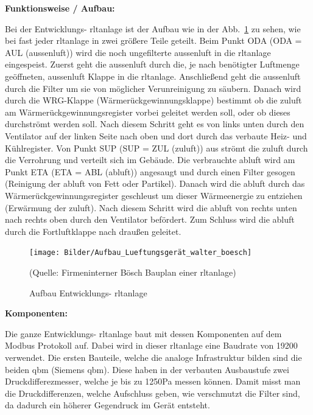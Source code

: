 \textbf{Funktionsweise / Aufbau:}

Bei der Entwicklungs- \ac{rltanlage} ist der Aufbau wie in der Abb.~\ref{fig:Bauplan_entwicklung} zu sehen, wie bei fast jeder \ac{rltanlage} in zwei größere Teile geteilt.
Beim Punkt ODA (ODA = AUL (\gls{aussenluft})) wird die noch ungefilterte \gls{aussenluft} in die \ac{rltanlage} eingespeist. Zuerst geht die \gls{aussenluft} durch die, je nach benötigter Luftmenge geöffneten, \gls{aussenluft} Klappe in die \ac{rltanlage}. Anschließend geht die \gls{aussenluft} durch die Filter um sie von möglicher Verunreinigung zu säubern. Danach wird durch die WRG-Klappe (Wärmerückgewinnungsklappe) bestimmt ob die \gls{zuluft} am Wärmerückgewinnungsregister vorbei geleitet werden soll, oder ob dieses durchströmt werden soll. Nach diesem Schritt geht es von links unten durch den Ventilator auf der linken Seite nach oben und dort durch das verbaute Heiz- und Kühlregister. Von Punkt SUP (SUP = ZUL (\gls{zuluft})) aus strömt die \gls{zuluft} durch die Verrohrung und verteilt sich im Gebäude. Die verbrauchte \gls{abluft} wird am Punkt ETA (ETA = ABL (\gls{abluft})) angesaugt und durch einen Filter gesogen (Reinigung der \gls{abluft} von \zB Fett oder Partikel). Danach wird die \gls{abluft} durch das Wärmerückgewinnungsregister geschleust um dieser Wärmeenergie zu entziehen (Erwärmung der \gls{zuluft}). Nach diesem Schritt wird die \gls{abluft} von rechts unten nach rechts oben durch den Ventilator befördert. Zum Schluss wird die \gls{abluft} durch die Fortluftklappe nach draußen geleitet. 

\begin{figure}[H]
	\centering
	\texttt{[image: Bilder/Aufbau\_Lueftungsgerät\_walter\_boesch]}
	\caption{Aufbau Entwicklungs- \ac{rltanlage}} 
	(Quelle: Firmeninterner Bösch Bauplan einer \ac{rltanlage})
	\label{fig:Bauplan_entwicklung}
\end{figure}


\textbf{Komponenten:}

Die ganze Entwicklungs- \ac{rltanlage} baut mit dessen Komponenten auf dem Modbus Protokoll auf. Dabei wird in dieser \ac{rltanlage} eine Baudrate von 19200 verwendet. Die ersten Bauteile, welche die analoge Infrastruktur bilden sind die beiden \gls{qbm}  (Siemens \gls{qbm}). Diese haben in der verbauten Ausbaustufe zwei Druckdifferezmesser, welche je bis zu 1250Pa messen können. Damit misst man die Druckdifferenzen, welche Aufschluss geben, wie verschmutzt die Filter sind, da dadurch ein höherer Gegendruck im Gerät entsteht.

